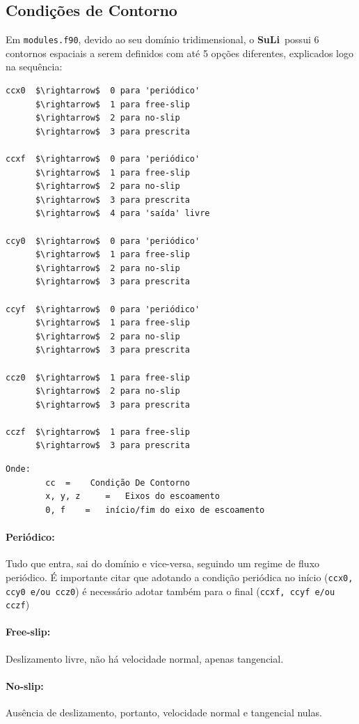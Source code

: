 \documentclass[12pt, a4paper]{article}
\newcommand{\SL}{{\bf SuLi}}
\begin{document}
\subsection{Condições de Contorno}
Em \verb|modules.f90|, devido ao seu domínio tridimensional, o \SL\ possui 6 contornos espaciais a serem definidos com até 5 opções diferentes, explicados logo na sequência:
\begin{lstlisting}[escapeinside='']
ccx0  $\rightarrow$  0 para 'periódico'
      $\rightarrow$  1 para free-slip
      $\rightarrow$  2 para no-slip
      $\rightarrow$  3 para prescrita

ccxf  $\rightarrow$  0 para 'periódico'
      $\rightarrow$  1 para free-slip
      $\rightarrow$  2 para no-slip
      $\rightarrow$  3 para prescrita
      $\rightarrow$  4 para 'saída' livre
      
ccy0  $\rightarrow$  0 para 'periódico'
      $\rightarrow$  1 para free-slip
      $\rightarrow$  2 para no-slip
      $\rightarrow$  3 para prescrita
      
ccyf  $\rightarrow$  0 para 'periódico'
      $\rightarrow$  1 para free-slip
      $\rightarrow$  2 para no-slip
      $\rightarrow$  3 para prescrita
      
ccz0  $\rightarrow$  1 para free-slip
      $\rightarrow$  2 para no-slip
      $\rightarrow$  3 para prescrita
      
cczf  $\rightarrow$  1 para free-slip
      $\rightarrow$  3 para prescrita
\end{lstlisting}

\begin{verbatim}
Onde: 	
		cc 	=	 Condição De Contorno
		x, y, z 	=	Eixos do escoamento
		0, f	= 	início/fim do eixo de escoamento
\end{verbatim}

\paragraph{Periódico:} Tudo que entra, sai do domínio e vice-versa, seguindo um regime de fluxo periódico. É importante citar que adotando a condição periódica no início (\verb|ccx0, ccy0 e/ou ccz0|) é necessário adotar também para o final (\verb|ccxf, ccyf e/ou cczf|)
\paragraph{Free-slip:} Deslizamento livre, não há velocidade normal, apenas tangencial.
\paragraph{No-slip:} Ausência de deslizamento, portanto, velocidade normal e tangencial nulas.
\end{document}
